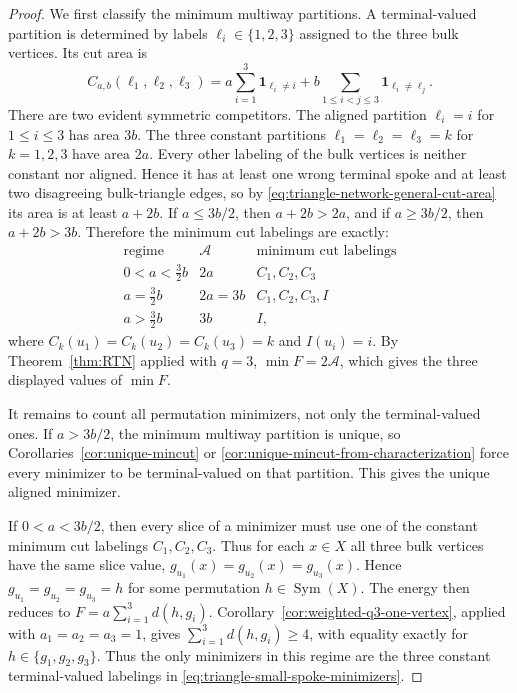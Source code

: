 \documentclass[11pt,oneside,letterpaper]{article}
\numberwithin{equation}{section}
\theoremstyle{definition}
\theoremstyle{remark}
\DeclareMathOperator{\Sym}{Sym}
\begin{document}
\begin{proof}
We first classify the minimum multiway partitions.  A terminal-valued
partition is determined by labels $\ell_i\in\{1,2,3\}$ assigned to the
three bulk vertices.  Its cut area is
\begin{equation}\label{eq:triangle-network-general-cut-area}
C_{a,b}(\ell_1,\ell_2,\ell_3)
=
a\sum_{i=1}^3\mathbf 1_{\ell_i\neq i}
+
b\sum_{1\le i<j\le 3}\mathbf 1_{\ell_i\neq \ell_j}.
\end{equation}
There are two evident symmetric competitors.  The aligned partition
$\ell_i=i$ for $1\le i\le 3$ has area $3b$.  The three constant
partitions $\ell_1=\ell_2=\ell_3=k$ for $k=1,2,3$ have area $2a$.
Every other labeling of the bulk vertices is neither constant nor
aligned.  Hence it has at least one wrong terminal spoke and at least
two disagreeing bulk-triangle edges, so by
\eqref{eq:triangle-network-general-cut-area} its area is at least
$a+2b$.  If $a\le 3b/2$, then $a+2b>2a$, and if $a\ge 3b/2$, then
$a+2b>3b$.
Therefore the minimum cut labelings are exactly:
\[
\begin{array}{c|c|c}
\text{regime} & \mathcal A & \text{minimum cut labelings}\\
\hline
0<a<\frac32 b & 2a & C_1,C_2,C_3\\
a=\frac32 b & 2a=3b & C_1,C_2,C_3,I\\
a>\frac32 b & 3b & I,
\end{array}
\]
where $C_k(u_1)=C_k(u_2)=C_k(u_3)=k$ and $I(u_i)=i$. By Theorem~\ref{thm:RTN} applied with $q=3$, $\min F=2\mathcal A$, which gives the three displayed values of $\min F$.

It remains to count all permutation minimizers, not only the
terminal-valued ones.  If $a>3b/2$, the minimum multiway partition is
unique, so Corollaries~\ref{cor:unique-mincut} or \ref{cor:unique-mincut-from-characterization} force every minimizer to be terminal-valued on that partition.  This gives the
unique aligned minimizer.

If $0<a<3b/2$, then every slice of a minimizer must use one of the
constant minimum cut labelings $C_1,C_2,C_3$.  Thus for each
$x\in X$ all three bulk vertices have the same slice value,
$g_{u_1}(x)=g_{u_2}(x)=g_{u_3}(x)$.  Hence
$g_{u_1}=g_{u_2}=g_{u_3}=h$ for some permutation
$h\in \Sym(X)$.  The energy then reduces to
$F=a\sum_{i=1}^3 d(h,g_i)$.  Corollary~\ref{cor:weighted-q3-one-vertex},
applied with $a_1=a_2=a_3=1$, gives
$\sum_{i=1}^3 d(h,g_i)\ge 4$, with equality exactly for
$h\in\{g_1,g_2,g_3\}$.
Thus the only minimizers in this regime are the three constant
terminal-valued labelings in
\eqref{eq:triangle-small-spoke-minimizers}.


\end{proof}
\end{document}
